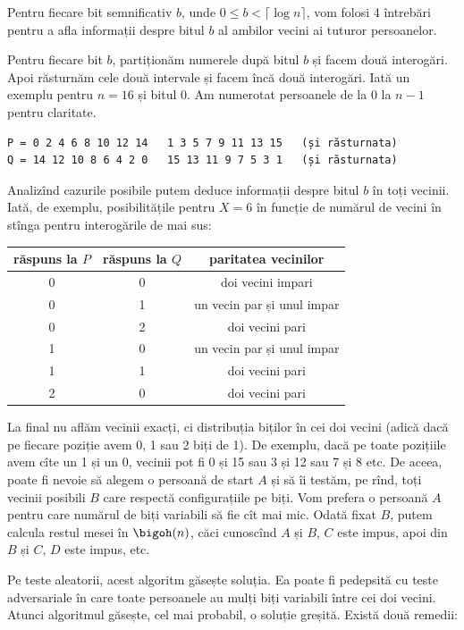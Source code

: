 Pentru fiecare bit semnificativ $b$, unde $0 \leq b < \lceil \log n \rceil$, vom folosi 4 întrebări pentru a afla informații despre bitul $b$ al ambilor vecini ai tuturor persoanelor.

Pentru fiecare bit $b$, partiționăm numerele după bitul $b$ și facem două interogări. Apoi răsturnăm cele două intervale și facem încă două interogări. Iată un exemplu pentru $n = 16$ și bitul 0. Am numerotat persoanele de la 0 la $n-1$ pentru claritate.

\begin{verbatim}
P = 0 2 4 6 8 10 12 14   1 3 5 7 9 11 13 15   (și răsturnata)
Q = 14 12 10 8 6 4 2 0   15 13 11 9 7 5 3 1   (și răsturnata)
\end{verbatim}

Analizînd cazurile posibile putem deduce informații despre bitul $b$ în toți vecinii. Iată, de exemplu, posibilitățile pentru $X=6$ în funcție de numărul de vecini în stînga pentru interogările de mai sus:

\begin{table}[H]
  \centering
  \begin{tabular}{ c|c|c }
    \hline
    răspuns la $P$ & răspuns la $Q$ & paritatea vecinilor \\
    \hline
    0 & 0 & doi vecini impari \\
    0 & 1 & un vecin par și unul impar \\
    0 & 2 & doi vecini pari \\
    1 & 0 & un vecin par și unul impar \\
    1 & 1 & doi vecini pari \\
    2 & 0 & doi vecini pari \\
    \hline
  \end{tabular}
\end{table}

La final nu aflăm vecinii exacți, ci distribuția biților în cei doi vecini (adică dacă pe fiecare poziție avem 0, 1 sau 2 biți de 1). De exemplu, dacă pe toate pozițiile avem cîte un 1 și un 0, vecinii pot fi 0 și 15 sau 3 și 12 sau 7 și 8 etc. De aceea, poate fi nevoie să alegem o persoană de start $A$ și să îi testăm, pe rînd, toți vecinii posibili $B$ care respectă configurațiile pe biți. Vom prefera o persoană $A$ pentru care numărul de biți variabili să fie cît mai mic. Odată fixat $B$, putem calcula restul mesei în $\bigoh(n)$, căci cunoscînd $A$ și $B$, $C$ este impus, apoi din $B$ și $C$, $D$ este impus, etc.

Pe teste aleatorii, acest algoritm găsește soluția. Ea poate fi pedepsită cu teste adversariale în care toate persoanele au mulți biți variabili între cei doi vecini. Atunci algoritmul găsește, cel mai probabil, o soluție greșită. Există două remedii:

